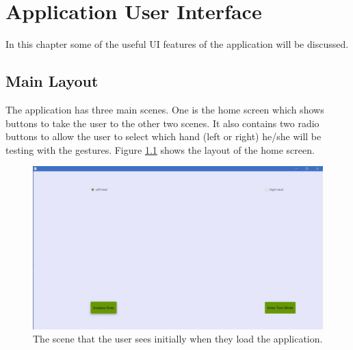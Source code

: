 \chapter{Application User Interface }

\label{Chapter6_appUI} 

In this chapter some of the useful UI features of the application will be discussed. 

\section{Main Layout}

The application has three main scenes. One is the home screen which shows buttons to take the user to the other two scenes. It also contains two radio buttons to allow the user to select which hand (left or right) he/she will be testing with the gestures. Figure  \ref{fig:homeScreen} shows the layout of the home screen. 
\begin{figure}[H]
\centering
\includegraphics[scale=0.35]{Figures/6_homeScreen.JPG}
\caption[Home Screen Layout]{The scene that the user sees initially when they load the application.}
\label{fig:homeScreen}
\end{figure}

